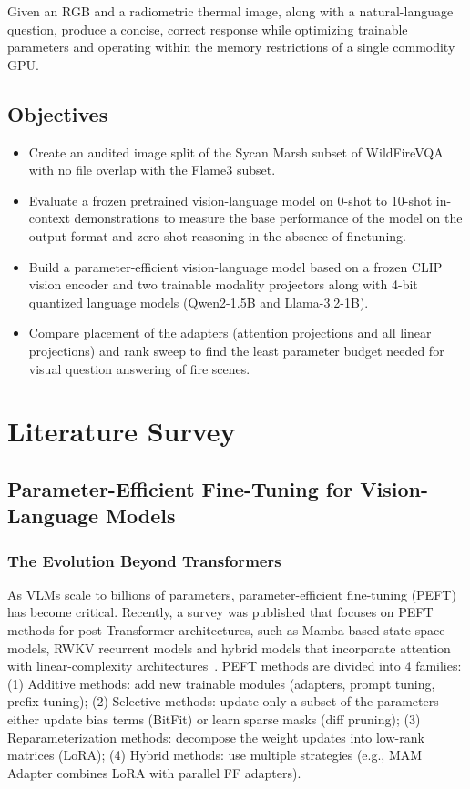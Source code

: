 \documentclass[conference]{IEEEtran}
\begin{document}
Given an RGB and a radiometric thermal image, along with a natural-language question, produce a concise, correct response while optimizing trainable parameters and operating within the memory restrictions of a single commodity GPU.

\subsection{Objectives}

\begin{itemize}[leftmargin=*, itemsep=1pt, topsep=2pt, parsep=0pt]
  \item Create an audited image split of the Sycan Marsh subset of WildFireVQA with no file overlap with the Flame3 subset.
  \item Evaluate a frozen pretrained vision-language model on 0-shot to 10-shot in-context demonstrations to measure the base performance of the model on the output format and zero-shot reasoning in the absence of finetuning.
  \item Build a parameter-efficient vision-language model based on a frozen CLIP vision encoder and two trainable modality projectors along with 4-bit quantized language models (Qwen2-1.5B and Llama-3.2-1B).
  \item Compare placement of the adapters (attention projections and all linear projections) and rank sweep to find the least parameter budget needed for visual question answering of fire scenes.
\end{itemize}

\section{Literature Survey}

\subsection{Parameter-Efficient Fine-Tuning for Vision-Language Models}

\subsubsection{The Evolution Beyond Transformers}

As VLMs scale to billions of parameters, parameter-efficient fine-tuning (PEFT) has become critical. Recently, a survey was published that focuses on PEFT methods for post-Transformer architectures, such as Mamba-based state-space models, RWKV recurrent models and hybrid models that incorporate attention with linear-complexity architectures~\cite{peft2024survey}. PEFT methods are divided into 4 families: (1) Additive methods: add new trainable modules (adapters, prompt tuning, prefix tuning); (2) Selective methods: update only a subset of the parameters -- either update bias terms (BitFit) or learn sparse masks (diff pruning); (3) Reparameterization methods: decompose the weight updates into low-rank matrices (LoRA); (4) Hybrid methods: use multiple strategies (e.g., MAM Adapter combines LoRA with parallel FF adapters).
\end{document}
